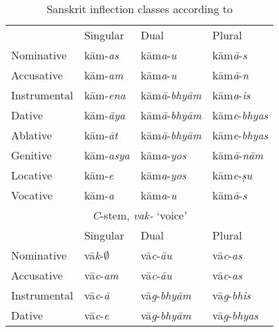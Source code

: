 \begin{table}
    \centering
    \caption{Sanskrit inflection classes according to \textcite{Whitney.1986}} \label{tab:aistems-sanskrit}
    \begin{tabular}{llll}
      \lsptoprule
      \multicolumn{4}{c}{\textit{a}-stem, \textit{kāma-} `desire'}                                          \\
      \midrule
      & Singular                 & Dual                         & Plural                       \\
      Nominative   & kām-\textit{as}          & kām\textit{a}-\textit{u}     & kām\textit{ā}-\textit{s}     \\
      Accusative   & kām-\textit{am}          & kām\textit{a}-\textit{u}     & kām\textit{ā}-\textit{n}     \\
      Instrumental & kām-\textit{ena}         & kām\textit{ā}-\textit{bhyām} & kām\textit{a}-\textit{is}    \\
      Dative       & kām-\textit{āya}         & kām\textit{ā}-\textit{bhyām} & kām\textit{e}-\textit{bhyas} \\
      Ablative     & kām-\textit{āt}          & kām\textit{ā}-\textit{bhyām} & kām\textit{e}-\textit{bhyas} \\
      Genitive     & kām-\textit{asya}        & kām\textit{a}-\textit{yos}   & kām\textit{ā}-\textit{nām}   \\
      Locative     & kām-\textit{e}           & kām\textit{a}-\textit{yos}   & kām\textit{e}-\textit{ṣu}    \\
      Vocative     & kām-\textit{a}           & kām\textit{a}-\textit{u}     & kām\textit{ā}-\textit{s}     \\
      \midrule
      \multicolumn{4}{c}{\textit{C}-stem, \textit{vak-} `voice'}                                            \\
      \midrule
      & Singular                 & Dual     & Plural   \\
      Nominative   & vā\textit{k}-$\emptyset$ & vā\textit{c}-\textit{āu}    & vā\textit{c}-\textit{as}    \\
      Accusative   & vā\textit{c}-\textit{am}          & vā\textit{c}-\textit{āu}    & vā\textit{c}-\textit{as}    \\
      Instrumental & vā\textit{c}-\textit{ā }          & vā\textit{g}-\textit{bhyām} & vā\textit{g}-\textit{bhis}  \\
      Dative       & vā\textit{c}-\textit{e }          & vā\textit{g}-\textit{bhyām} & vā\textit{g}-\textit{bhyas} \\

\end{tabular}
\end{table}
